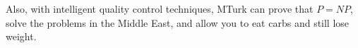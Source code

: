 \documentclass[11pt]{article}
\begin{document}
Also, with intelligent quality control techniques, MTurk can prove that $P = NP$, solve the problems in the Middle East, and allow you to eat carbs and still lose weight.



\end{document}
